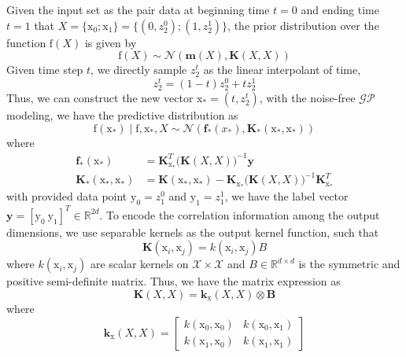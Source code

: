 \documentclass{article}
\begin{document}
Given the input set as the pair data at beginning time $t=0$ and ending time $t=1$ that $X = \{\mathrm{x}_0; \mathrm{x}_1  \}=\{ (0, z^0_2);  (1, z^1_2)\}$, the prior distribution over the function $\mathrm{f}(X)$ is given by 
\begin{equation}
    \mathrm{f}(X) \sim \mathcal{N}(\mathbf{m}(X), \mathbf{K}(X,X))
\end{equation}
Given time step $t$, we directly sample $z^t_2$ as the linear interpolant of time,
\begin{equation}
    z^t_2 = (1-t) z^0_2 + t z^1_2
\end{equation}
Thus, we can construct the new vector $\mathrm{x}_* = (t, z^t_2)$, with the noise-free $\mathcal{GP}$ modeling, we have the predictive distribution as  
\begin{equation}
    \mathrm{f}(\mathrm{x}_*) \mid \mathrm{f}, \mathrm{x}_*,X \sim \mathcal{N}(\mathbf{f}_*(x_*), \mathbf{K}_*(\mathrm{x}_*, \mathrm{x}_*))
\end{equation}
where 
\begin{align}
    \mathbf{f}_{*}(\mathrm{x}_*) &= \mathbf{K}^{T}_{\mathrm{x}_{*}} \big(\mathbf{K}(X,X) )^{-1} \mathbf{y} \\ 
    \mathbf{K}_{*}(\mathrm{x}_{*}, \mathrm{x}_{*}) &= \mathbf{K}(\mathrm{x}_{*}, \mathrm{x}_{*}) - \mathbf{K}_{\mathrm{x}_{*}}\big(\mathbf{K}(X,X)\big)^{-1}\mathbf{K}^{T}_{\mathrm{x}_{*}}
\end{align}
with provided data point $\mathrm{y}_0 = z^0_1$ and $\mathrm{y}_1 = z^1_1$, we have the label vector $\mathbf{y} = [\mathrm{y}_0  \: \mathrm{y}_1]^T \in \mathbb{R}^{2d}$. To encode the correlation information among the output dimensions, we use separable kernels \citep{alvarez2012kernelsvectorvaluedfunctionsreview} as the output kernel function, such that 
\begin{equation}
    \mathbf{K}(\mathrm{x}_i, \mathrm{x}_j)  = k(\mathrm{x}_i, \mathrm{x}_j) B
\end{equation} 
where $k (\mathrm{x}_i, \mathrm{x}_j)$ are scalar kernels on $\mathcal{X} \times \mathcal{X}$ and $B\in \mathbb{R}^{d \times d}$ is the symmetric and positive semi-definite matrix. Thus, we have the matrix expression as 
\begin{equation}
    \mathbf{K}(X, X) = \mathbf{k}_{\mathrm{x}}(X,X)  \otimes  \mathbf{B} 
\end{equation}
where 
\begin{equation}
    \mathbf{k}_{\mathrm{x}}(X,X) = \begin{bmatrix}
k(\mathrm{x}_0, \mathrm{x}_0) & k(\mathrm{x}_0, \mathrm{x}_1) \\
k(\mathrm{x}_1, \mathrm{x}_0) & k(\mathrm{x}_1, \mathrm{x}_1)
\end{bmatrix}
\end{equation}
\end{document}
